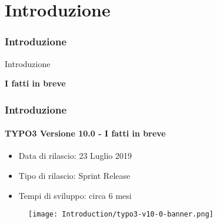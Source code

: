 %

\section{Introduzione}
\begin{frame}[fragile]
	\frametitle{Introduzione}

	\begin{center}\huge{Introduzione}\end{center}
	\begin{center}\huge{\color{typo3darkgrey}\textbf{I fatti in breve}}\end{center}

\end{frame}


\begin{frame}[fragile]
	\frametitle{Introduzione}
	\framesubtitle{TYPO3 Versione 10.0 - I fatti in breve}

	\begin{itemize}
		\item Data di rilascio: 23 Luglio 2019
		\item Tipo di rilascio: Sprint Release
		\item Tempi di sviluppo: circa 6 mesi
	\end{itemize}

	\begin{figure}
		\texttt{[image: Introduction/typo3-v10-0-banner.png]}
	\end{figure}

\end{frame}


